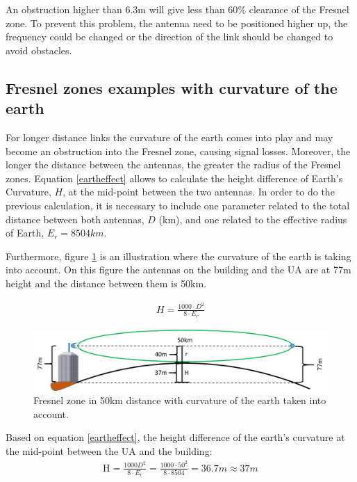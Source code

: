 An obstruction higher than 6.3m will give less than 60$\%$ clearance of the Fresnel zone. To prevent this problem, the antenna need to be positioned higher up, the frequency could be changed or the direction of the link should be changed to avoid obstacles.

\subsection{Fresnel zones examples with curvature of the earth}
For longer distance links the curvature of the earth comes into play and may become an obstruction into the Fresnel zone, causing signal losses. Moreover, the longer the distance between the antennas, the greater the radius of the Fresnel zones. Equation \ref{eartheffect} allows to calculate the height difference of Earth's Curvature, $H$, at the mid-point between the two antennas. In order to do the previous calculation, it is necessary to include one parameter related to the total distance between both antennas, $D$ (km), and one related to the effective radius of Earth, $E_r = 8 504 km$.

Furthermore, figure \ref{fig:fresnel_50km_curvature} is an illustration where the curvature of the earth is taking into account. On this figure the antennas on the building and the UA are at 77m height and the distance between them is 50km. 

\begin{align}
H = \frac{1000\cdot D^2}{8\cdot E_r}\label{eartheffect}
\end{align}

\begin{figure}[H]
	\centering
	\includegraphics[scale=0.50]{figures/fresnel_50km_curvature.png}
	\caption{Fresnel zone in 50km distance with curvature of the earth taken into account.}
	\label{fig:fresnel_50km_curvature}
\end{figure}

Based on equation \ref{eartheffect}, the height difference of the earth's curvature at the mid-point between the UA and the building:
\begin{align}
\text{H} = \frac{1000 D^2}{8 \cdot E_r} = \frac{1000 \cdot 50^2}{8\cdot 8504} = 36.7m \approx 37m 
\end{align}

